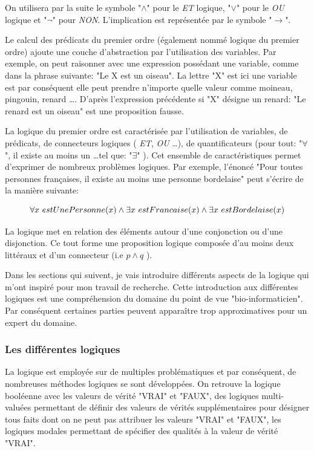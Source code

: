 \begin{refsegment}
    On utilisera par la suite le symbole "$\land$" pour le \textit{ET} logique, "$\lor$" pour le \textit{OU} logique et "$\lnot$" pour \textit{NON}. L'implication est représentée par le symbole "$\rightarrow$". 
    
    Le calcul des prédicats du premier ordre (également nommé logique du premier ordre) ajoute une couche d'abstraction par l'utilisation des variables. Par exemple, on peut raisonner avec une expression possédant une variable, comme dans la phrase suivante: "Le X est un oiseau". La lettre "X" est ici une variable est par conséquent elle peut prendre n'importe quelle valeur comme moineau, pingouin, renard \ldots. D'après l'expression précédente si "X" désigne un renard: "Le renard est un oiseau" est une proposition fausse.
    
    La logique du premier ordre est caractérisée par l'utilisation de variables, de prédicats, de connecteurs logiques ( \textit{ET}, \textit{OU} \ldots), de quantificateurs (pour tout: "$\forall$", il existe au moins un \ldots tel que: "$\exists$" ). Cet ensemble de caractéristiques permet d’exprimer de nombreux problèmes logiques. Par exemple, l'énoncé "Pour toutes personnes françaises, il existe au moins une personne bordelaise" peut s'écrire de la manière suivante:\nolisttopbreak
    
    \begin{equation*}
        \forall x~estUnePersonne(x) \land \exists x~estFrancaise(x) \land \exists x~estBordelaise(x) \stepcounter{equation}
    \end{equation*}
    
    
    La logique met en relation des éléments autour d'une conjonction ou d'une disjonction. Ce tout forme une proposition logique composée d'au moins deux littéraux et d'un connecteur (i.e $p \land q$ ).
    
    Dans les sections qui suivent, je vais introduire différents aspects de la logique qui m'ont inspiré pour mon travail de recherche. Cette introduction aux différentes logiques est une compréhension du domaine du point de vue "bio-informaticien". Par conséquent certaines parties peuvent apparaître trop approximatives pour un expert du domaine.
    
    \subsubsection{Les différentes logiques}
    
    La logique est employée sur de multiples problématiques et par conséquent, de nombreuses méthodes logiques se sont développées. On retrouve la logique booléenne avec les valeurs de vérité "VRAI" et "FAUX", des logiques multi-valuées permettant de définir des valeurs de vérités supplémentaires pour désigner tous faits dont on ne peut pas attribuer les valeurs  "VRAI" et "FAUX", les logiques modales permettant de spécifier des qualités à la valeur de vérité  "VRAI".
    

\end{refsegment}
